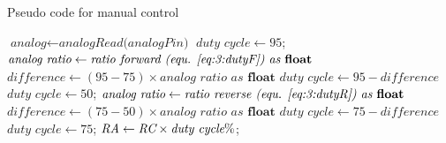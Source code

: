 \begin{algorithm}
	\caption{Pseudo code for manual control}
	\label{alg:3:manualControl}
	\begin{algorithmic}[1]
		\State $\textit{analog} \gets \textit{analogRead(analogPin)}$
		\State $\textit{duty cycle} \gets 95$;
		\State $\textit{analog ratio} \gets \textit{ratio forward (equ. \ref{eq:3:dutyF}) as } \textbf{float} $
		\State $\textit{difference} \gets (95 - 75) \times \textit{analog ratio as } \textbf{float}$
		\State $\textit{duty cycle} \gets 95 - \textit{difference} $
		\State $\textit{duty cycle} \gets 50$;
		\State $\textit{analog ratio} \gets \textit{ratio reverse (equ. \ref{eq:3:dutyR}) as }\textbf{float} $
		\State $\textit{difference} \gets (75 - 50) \times \textit{analog ratio as } \textbf{float}$
		\State $\textit{duty cycle} \gets 75 - \textit{difference}$
		\Else 
		\State $\textit{duty cycle} \gets 75$;
		\EndIf
		\EndProcedure
		\State $\textit{RA} \gets \textit{RC} \times \textit{duty cycle\SI{}{\percent}}$;
		\EndProcedure
	\end{algorithmic}
\end{algorithm}
